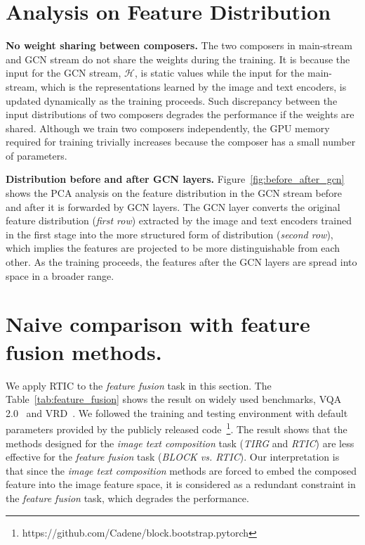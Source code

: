 \documentclass[10pt,twocolumn,letterpaper]{article}
\begin{document}
\section{Analysis on Feature Distribution}
\noindent
\textbf{No weight sharing between composers.} The two composers in main-stream and GCN stream do not share the weights during the training. It is because the input for the GCN stream, $\mathcal{H}$, is static values while the input for the main-stream, which is the representations learned by the image and text encoders, is updated dynamically as the training proceeds. Such discrepancy between the input distributions of two composers degrades the performance if the weights are shared. Although we train two composers independently, the GPU memory required for training trivially increases because the composer has a small number of parameters.

\noindent
\textbf{Distribution before and after GCN layers.} Figure~\ref{fig:before_after_gcn} shows the PCA analysis on the feature distribution in the GCN stream before and after it is forwarded by GCN layers. The GCN layer converts the original feature distribution (\textit{first row}) extracted by the image and text encoders trained in the first stage into the more structured form of distribution (\textit{second row}), which implies the features are projected to be more distinguishable from each other. As the training proceeds, the features after the GCN layers are spread into space in a broader range.


\section{Naive comparison with feature fusion methods.}
We apply RTIC to the \textit{feature fusion} task in this section. The Table~\ref{tab:feature_fusion} shows the result on widely used benchmarks, VQA 2.0~\cite{goyal2017making} and VRD~\cite{lu2016visual}. We followed the training and testing environment with default parameters provided by the publicly released code~\footnote{https://github.com/Cadene/block.bootstrap.pytorch}. The result shows that the methods designed for the \textit{image text composition} task (\textit{TIRG} and \textit{RTIC}) are less effective for the \textit{feature fusion} task (\textit{BLOCK vs. RTIC}). Our interpretation is that since the \textit{image text composition} methods are forced to embed the composed feature into the image feature space, it is considered as a redundant constraint in the \textit{feature fusion} task, which degrades the performance.
\end{document}
